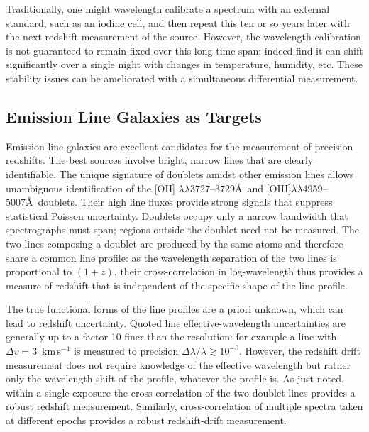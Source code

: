 \documentclass[preprint2, 10pt]{aastex}
\begin{document}
Traditionally, one might wavelength calibrate a spectrum with an external 
standard, such as an iodine cell, and then repeat this ten or so years 
later with the next redshift measurement of the source.  However, the 
wavelength calibration is not guaranteed to remain fixed over this long time 
span; indeed \citet{griest1,griest2} find it can shift significantly over a 
single night with changes in temperature, humidity, etc.  These stability 
issues can be ameliorated with a simultaneous differential measurement. 


\subsection{Emission Line Galaxies as Targets} 

Emission line galaxies are excellent candidates for the measurement of 
precision redshifts. The best sources involve bright, narrow lines that 
are clearly identifiable. 
The unique signature
of doublets amidst  other emission lines allows unambiguous identification of the [OII] $\lambda\lambda$3727--3729\AA\ 
and [OIII]$\lambda\lambda$4959--5007\AA\ doublets.
Their high line fluxes provide strong signals that suppress statistical Poisson uncertainty.
Doublets occupy only a narrow bandwidth that spectrographs must span; 
regions outside the doublet need not be measured. 
The two lines composing a doublet are produced by the same atoms and therefore
share a common line profile: as the wavelength separation of the two lines is proportional to $(1+z)$, their cross-correlation in log-wavelength
thus provides a measure of redshift that is independent of the specific shape of the line profile.

The true functional forms of the line profiles are a priori unknown, which can lead to redshift uncertainty.  Quoted line effective-wavelength uncertainties
are generally up to a factor 10 finer than the resolution: for example a line with $\Delta v=3$~km\,s$^{-1}$ is measured to
precision $\Delta \lambda/\lambda \gtrsim 10^{-6}$.
However, the redshift drift measurement does not require knowledge of the effective wavelength but rather only the wavelength shift
of the profile, whatever the profile is. 
As just noted, within a single exposure the cross-correlation of the two doublet lines provides a robust redshift measurement.
Similarly, cross-correlation of multiple spectra taken at different epochs provides a robust redshift-drift measurement. 
\end{document}
